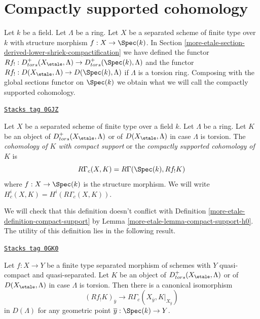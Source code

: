 \section{Compactly supported cohomology}
\label{more-etale-section-compactly-supported-cohomology}
Let $k$ be a field. Let $\Lambda$ be a ring. Let $X$ be a separated scheme
of finite type over $k$ with structure morphism $f : X \to \Spec(k)$.
In Section \ref{more-etale-section-derived-lower-shriek-compactification}
we have defined the functor
$Rf_! : D^+_{tors}(X_\etale, \Lambda) \to D^+_{tors}(\Spec(k), \Lambda)$
and the functor $Rf_! : D(X_\etale, \Lambda) \to D(\Spec(k), \Lambda)$
if $\Lambda$ is a torsion ring. Composing with the global sections functor
on $\Spec(k)$ we obtain what we will call the compactly supported cohomology.

\begin{definition}
\label{more-etale-definition-cohomology-compact-support}
\href{https://stacks.math.columbia.edu/tag/0GJZ}{\texttt{Stacks tag 0GJZ}}

Let $X$ be a separated scheme of finite type over a field $k$.
Let $\Lambda$ be a ring. Let $K$ be an object of
$D^+_{tors}(X_\etale, \Lambda)$
or of $D(X_\etale, \Lambda)$ in case $\Lambda$ is torsion.
The {\it cohomology of $K$ with compact support} or the
{\it compactly supported cohomology of $K$} is
$$
R\Gamma_c(X, K) = R\Gamma(\Spec(k), Rf_!K)
$$
where $f : X \to \Spec(k)$ is the structure morphism. We will
write  $H^i_c(X, K) = H^i(R\Gamma_c(X, K))$.
\end{definition}

We will check that this definition doesn't conflict with
Definition \ref{more-etale-definition-compact-support} by
Lemma \ref{more-etale-lemma-compact-support-h0}.
The utility of this definition lies in the following result.

\begin{lemma}
\label{more-etale-lemma-stalk-R-f-shriek}
\href{https://stacks.math.columbia.edu/tag/0GK0}{\texttt{Stacks tag 0GK0}}

Let $f : X \to Y$ be a finite type separated morphism of schemes
with $Y$ quasi-compact and quasi-separated. Let $K$ be an object of
$D^+_{tors}(X_\etale, \Lambda)$ or of $D(X_\etale, \Lambda)$ in case
$\Lambda$ is torsion. Then there is a canonical isomorphism
$$
(Rf_!K)_{\overline{y}}
\longrightarrow
R\Gamma_c(X_{\overline{y}}, K|_{X_{\overline{y}}})
$$
in $D(\Lambda)$ for any geometric point $\overline{y} : \Spec(k) \to Y$.
\end{lemma}

